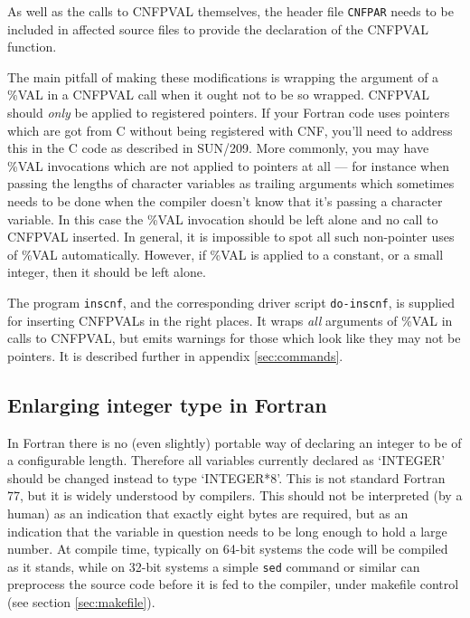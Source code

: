 \documentclass[twoside,11pt]{article}
\newcommand{\htmlref}[2]{#1}
\newcommand{\latexhtml}[2]{#1}
\newcommand{\xref}[3]{#1}
\renewcommand{\_}{\texttt{\symbol{95}}}
\newcommand{\xroutine}[1]{\htmlref{{\tt #1}}{#1}}
\newcommand{\xdofilter}[1]{\htmlref{{\tt do-#1}}{do-xxx}}
\newcommand{\file}[1]{{\tt #1}}
\begin{document}
As well as the calls to CNF\_PVAL themselves, 
the header file \file{CNF\_PAR} needs to be included
in affected source files to provide the declaration of the CNF\_PVAL function.

The main pitfall of making these modifications is
wrapping the argument of a \%VAL in a CNF\_PVAL call when it ought
not to be so wrapped.
CNF\_PVAL should {\em only\/} be applied to registered pointers.
If your Fortran code uses pointers which are got from C without 
being registered with CNF, you'll need to address this in the C code 
as described in \xref{SUN/209}{sun209}{pointers}.
More commonly, you may have \%VAL invocations which are not
applied to pointers at all --- for instance when passing 
the lengths of character variables as trailing arguments 
which sometimes needs to be done when the compiler doesn't know that
it's passing a character variable.  In this case the \%VAL 
invocation should be left alone and no call to CNF\_PVAL inserted.
In general, it is impossible to spot all such non-pointer uses
of \%VAL automatically.  However, if \%VAL is applied to a constant,
or a small integer, then it should be left alone.

The program \xroutine{inscnf}, and the corresponding driver script 
\xdofilter{inscnf}, is supplied for inserting CNF\_PVALs
in the right places.  It wraps {\em all\/} arguments of \%VAL 
in calls to CNF\_PVAL, but emits warnings for those which look like
they may not be pointers.
It is described further in
\latexhtml{appendix \ref{sec:commands}}{\htmlref{the appendix}{inscnf}}.

\subsection{Enlarging integer type in Fortran\label{sec:fint}}


In Fortran there is no (even slightly) portable way of declaring
an integer to be of a configurable length. 
Therefore all variables currently declared as `INTEGER' 
should be changed instead to type `INTEGER*8'. 
This is not standard Fortran 77, but it is widely understood by compilers.
This should not be interpreted (by a human) as an indication that exactly
eight bytes are required, but as an indication that 
the variable in question needs to be
long enough to hold a large number.
At compile time, typically on 64-bit systems the code will be compiled
as it stands, while on 32-bit systems a simple \file{sed} command or similar
can preprocess the source code before it is fed to the compiler,
under makefile control (see section \ref{sec:makefile}).
\end{document}
